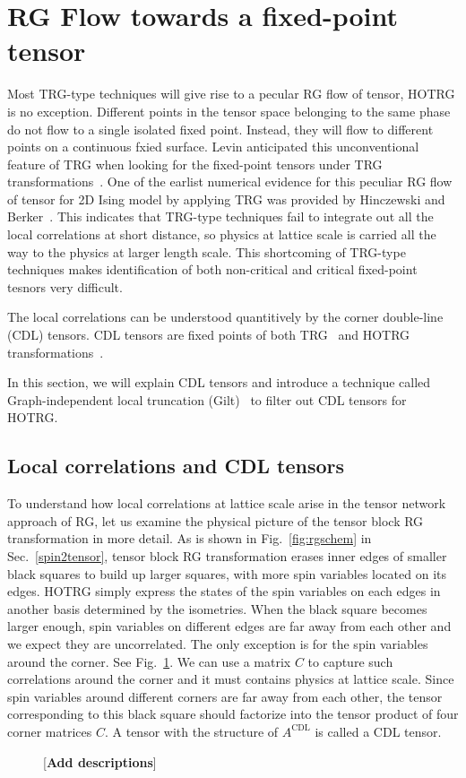 \documentclass[aps,prb,reprint,superscriptaddress]{revtex4-2}
\begin{document}
\section{RG Flow towards a fixed-point
tensor\label{fixRGflow}}
Most TRG-type techniques will give rise to a pecular RG flow of tensor,
HOTRG is no exception. Different points in the tensor space belonging to
the same phase do not flow to a single isolated fixed point. Instead,
they will flow to different points on a continuous fxied surface. Levin
anticipated this unconventional feature of TRG when looking for the
fixed-point tensors under TRG transformations~\cite{LevinTalk}. One of
the earlist numerical evidence for this peculiar RG flow of tensor for
2D Ising model by applying TRG was provided by Hinczewski and
Berker~\cite{Berker2008}. This indicates that TRG-type techniques fail
to integrate out all the local correlations at short distance, so physics at
lattice scale is carried all the way to the physics at larger length
scale. This shortcoming of TRG-type techniques makes identification of
both non-critical and critical fixed-point tesnors very difficult.
%

The local correlations can be understood quantitively by the
corner double-line (CDL) tensors. CDL tensors are fixed points of both
TRG~\cite{LevinTalk,GuWen2009,tnr,gilts} and HOTRG
transformations~\cite{hotrgfixpoint}.

In this section, we will explain CDL tensors and introduce a technique
called Graph-independent local truncation (Gilt)~\cite{gilts} to filter
out CDL tensors for HOTRG.

\subsection{Local correlations and CDL tensors\label{CDLten}}
To understand how local correlations at lattice scale arise in the
tensor network approach of RG, let us examine the physical picture of
the tensor block RG transformation in more detail. As is shown in
Fig.~\ref{fig:rgschem} in Sec.~\ref{spin2tensor}, tensor block RG
transformation erases inner edges of smaller black squares to build up
larger squares, with more spin variables located on its edges. HOTRG
simply express the states of the spin variables on each edges in another
basis determined by the isometries. When the black square becomes larger
enough, spin variables on different edges are far away from each other
and we expect they are uncorrelated. The only exception is for the spin
variables around the corner. See Fig.~\ref{fig:ariseCDL}. We can use a
matrix $C$ to capture such correlations around the corner and it must
contains physics at lattice scale. Since spin variables around different
corners are far away from each other, the tensor corresponding to this
black square should factorize into the tensor product of four corner
matrices $C$. A tensor with the structure of $A^{\text{CDL}}$ is called
a CDL tensor.
%
\begin{figure}[h]
    \caption{\label{fig:ariseCDL}[\textbf{Add descriptions}]}
\end{figure}
%
\end{document}
